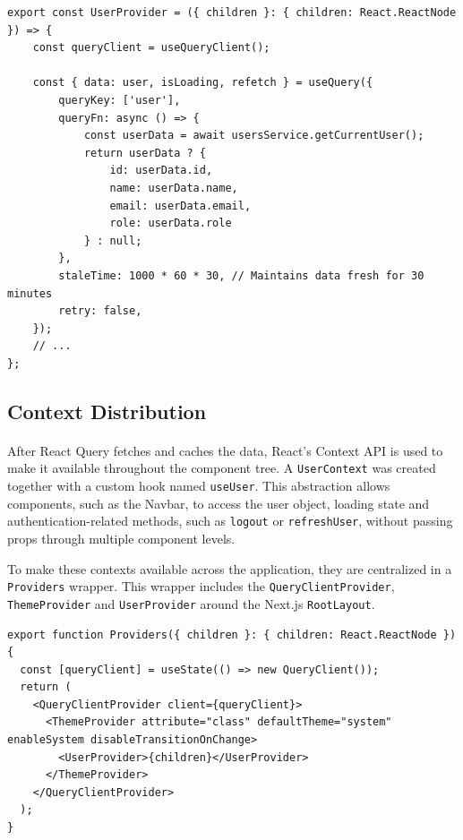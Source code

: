 \begin{lstlisting}[caption={UserProvider utilizing React Query}, label={lst:user-provider}]
export const UserProvider = ({ children }: { children: React.ReactNode }) => {
    const queryClient = useQueryClient();

    const { data: user, isLoading, refetch } = useQuery({
        queryKey: ['user'],
        queryFn: async () => {
            const userData = await usersService.getCurrentUser();
            return userData ? {
                id: userData.id,
                name: userData.name,
                email: userData.email,
                role: userData.role 
            } : null;
        },
        staleTime: 1000 * 60 * 30, // Maintains data fresh for 30 minutes
        retry: false,
    });
    // ...
};
\end{lstlisting}

\subsection{Context Distribution}
\paragraph{}After React Query fetches and caches the data, React’s Context API is used to make it available throughout the component tree. A \texttt{UserContext} was created together with a custom hook named \texttt{useUser}. This abstraction allows components, such as the Navbar, to access the user object, loading state and authentication-related methods, such as \texttt{logout} or \texttt{refreshUser}, without passing props through multiple component levels.

To make these contexts available across the application, they are centralized in a \texttt{Providers} wrapper. This wrapper includes the \texttt{QueryClientProvider}, \texttt{ThemeProvider} and \texttt{UserProvider} around the Next.js \texttt{RootLayout}.

\begin{lstlisting}[caption={Global Providers Setup}, label={lst:providers-setup}]
export function Providers({ children }: { children: React.ReactNode }) {
  const [queryClient] = useState(() => new QueryClient());
  return (
    <QueryClientProvider client={queryClient}>
      <ThemeProvider attribute="class" defaultTheme="system" enableSystem disableTransitionOnChange>
        <UserProvider>{children}</UserProvider>
      </ThemeProvider>
    </QueryClientProvider>
  );
}
\end{lstlisting}

